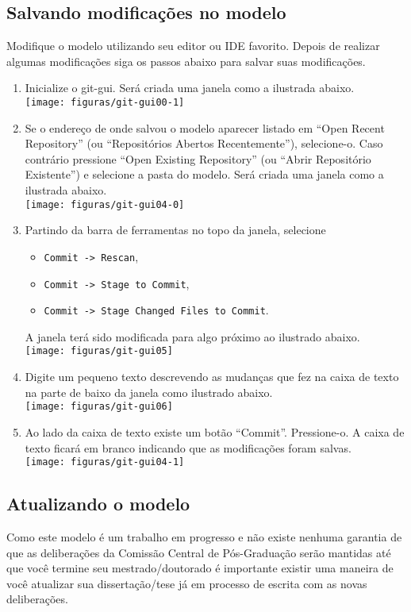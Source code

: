 \subsection{Salvando modificações no modelo}
Modifique o modelo utilizando seu editor ou IDE favorito. Depois de realizar
algumas modificações siga os passos abaixo para salvar suas modificações.
\begin{enumerate}
  \item Inicialize o git-gui. Será criada uma janela como a ilustrada abaixo.\\
    \texttt{[image: figuras/git-gui00-1]}
  \item Se o endereço de onde salvou o modelo aparecer listado em ``Open Recent
    Repository'' (ou ``Repositórios Abertos Recentemente''), selecione-o. Caso
    contrário pressione ``Open Existing Repository'' (ou ``Abrir Repositório
    Existente'') e selecione a pasta do modelo. Será criada uma janela como a
    ilustrada abaixo.\\
    \texttt{[image: figuras/git-gui04-0]}
  \item Partindo da barra de ferramentas no topo da janela, selecione
    \begin{itemize}
      \item \lstinline+Commit -> Rescan+,
      \item \lstinline+Commit -> Stage to Commit+,
      \item \lstinline+Commit -> Stage Changed Files to Commit+.
    \end{itemize}
    A janela terá sido modificada para algo próximo ao ilustrado abaixo.\\
    \texttt{[image: figuras/git-gui05]}
  \item Digite um pequeno texto descrevendo as mudanças que fez na caixa de
    texto na parte de baixo da janela como ilustrado abaixo.\\
    \texttt{[image: figuras/git-gui06]}
  \item Ao lado da caixa de texto existe um botão ``Commit''. Pressione-o. A
    caixa de texto ficará em branco indicando que as modificações foram
    salvas.\\
    \texttt{[image: figuras/git-gui04-1]}
\end{enumerate}

\subsection{Atualizando o modelo}
Como este modelo é um trabalho em progresso e não existe nenhuma garantia de que
as deliberações da Comissão Central de Pós-Graduação serão mantidas até que você
termine seu mestrado/doutorado é importante existir uma maneira de você
atualizar sua dissertação/tese já em processo de escrita com as novas
deliberações.


